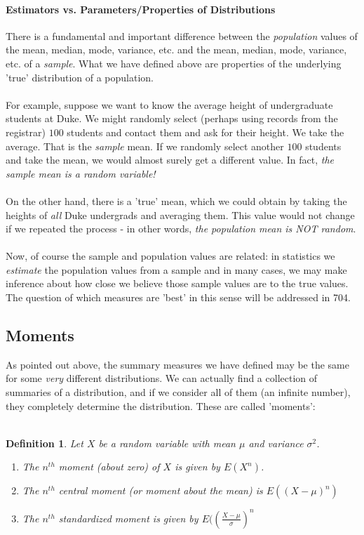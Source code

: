 \documentclass[12pt]{article} %
\newtheorem{defn}{Definition}
\begin{document}
\paragraph{Estimators vs. Parameters/Properties of Distributions}
There is a fundamental and important difference between the \emph{population} values of the mean, median, mode, variance, etc. and the mean, median, mode, variance, etc. of a \emph{sample}. What we have defined above are properties of the underlying 'true' distribution of a population. \\\\
For example, suppose we want to know the average height of undergraduate students at Duke. We might randomly select (perhaps using records from the registrar) $100$ students and contact them and ask for their height. We take the average. That is the \emph{sample} mean. If we randomly select another $100$ students and take the mean, we would almost surely get a different value. In fact, \emph{the sample mean is a random variable!} \\\\
On the other hand, there is a 'true' mean, which we could obtain by taking the heights of \emph{all} Duke undergrads and averaging them. This value would not change if we repeated the process - in other words, \emph{the population mean is NOT random}.\\\\
Now, of course the sample and population values are related: in statistics we \emph{estimate} the population values from a sample and in many cases, we may make inference about how close we believe those sample values are to the true values. The question of which measures are 'best' in this sense will be addressed in 704.
\subsection{Moments}
As pointed out above, the summary measures we have defined may be the same for some \emph{very} different distributions. We can actually find a collection of summaries of a distribution, and if we consider all of them (an infinite number), they completely determine the distribution. These are called 'moments':\\\\
\begin{defn}
Let $X$ be a random variable with mean $\mu$ and variance $\sigma^2$. 
\begin{enumerate}
\item The $n^{th}$ moment (about zero) of $X$ is given by $E(X^n)$.
\item The $n^{th}$ central moment (or moment about the mean) is $E((X-\mu)^n)$
\item The $n^{th}$ standardized moment is given by $E(\left(\frac{X-\mu}{\sigma}\right)^n$
\end{enumerate}
\end{defn} 
\end{document}
